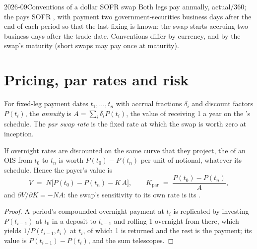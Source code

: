 \begin{dated}{2026-09}{Conventions of a dollar SOFR swap}\label{dat:m2:interest-rate-swaps:conventions}
Both legs pay annually, actual/360; the  pays SOFR , with payment two government-securities business days after the end of
each period so that the last fixing is known; the swap starts accruing two
business days after the trade date. Conventions differ by currency, and by
the swap's maturity (short swaps may pay once at maturity).
\end{dated}

\section{Pricing, par rates and risk}

\begin{definition}\label{def:m2:interest-rate-swaps:par}
For fixed-leg payment dates $t_1, \dots, t_n$ with accrual fractions $\delta_i$
and discount factors $P(t_i)$, the \emph{annuity} is $A =
\sum_i \delta_i P(t_i)$, the value of receiving 1 a year on the 's
schedule. The \emph{par swap rate} is the fixed rate at
which the swap is worth zero at inception.
\end{definition}

\begin{proposition}\label{prop:m2:interest-rate-swaps:value}
If overnight rates are discounted on the same curve that they project, the
 of an OIS from $t_0$ to $t_n$ is worth $P(t_0) - P(t_n)$ per unit
of notional, whatever its schedule. Hence the payer's value is
\[
V \;=\; N\bigl[P(t_0) - P(t_n) - K\,A\bigr],
\qquad
K_{\text{par}} \;=\; \frac{P(t_0) - P(t_n)}{A},
\]
and $\partial V/\partial K = -N A$: the swap's sensitivity to its own rate is
its .
\end{proposition}
\begin{proof}
A period's compounded overnight payment at $t_i$ is replicated by investing
$P(t_{i-1})$ at $t_0$ in a deposit to $t_{i-1}$ and rolling 1 overnight from
there, which yields $1/P(t_{i-1}, t_i)$ at $t_i$, of which 1 is returned and the
rest is the payment; its value is $P(t_{i-1}) - P(t_i)$, and the sum telescopes.
\end{proof}

